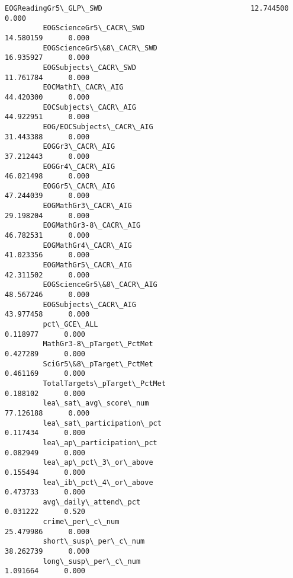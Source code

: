 \documentclass[11pt]{article}
\begin{document}
\begin{Verbatim}[commandchars=\\\{\}]
         EOGReadingGr5\_GLP\_SWD                                   12.744500      0.000   
         EOGScienceGr5\_CACR\_SWD                                  14.580159      0.000   
         EOGScienceGr5\&8\_CACR\_SWD                                16.935927      0.000   
         EOGSubjects\_CACR\_SWD                                    11.761784      0.000   
         EOCMathI\_CACR\_AIG                                       44.420300      0.000   
         EOCSubjects\_CACR\_AIG                                    44.922951      0.000   
         EOG/EOCSubjects\_CACR\_AIG                                31.443388      0.000   
         EOGGr3\_CACR\_AIG                                         37.212443      0.000   
         EOGGr4\_CACR\_AIG                                         46.021498      0.000   
         EOGGr5\_CACR\_AIG                                         47.244039      0.000   
         EOGMathGr3\_CACR\_AIG                                     29.198204      0.000   
         EOGMathGr3-8\_CACR\_AIG                                   46.782531      0.000   
         EOGMathGr4\_CACR\_AIG                                     41.023356      0.000   
         EOGMathGr5\_CACR\_AIG                                     42.311502      0.000   
         EOGScienceGr5\&8\_CACR\_AIG                                48.567246      0.000   
         EOGSubjects\_CACR\_AIG                                    43.977458      0.000   
         pct\_GCE\_ALL                                              0.118977      0.000   
         MathGr3-8\_pTarget\_PctMet                                 0.427289      0.000   
         SciGr5\&8\_pTarget\_PctMet                                  0.461169      0.000   
         TotalTargets\_pTarget\_PctMet                              0.188102      0.000   
         lea\_sat\_avg\_score\_num                                   77.126188      0.000   
         lea\_sat\_participation\_pct                                0.117434      0.000   
         lea\_ap\_participation\_pct                                 0.082949      0.000   
         lea\_ap\_pct\_3\_or\_above                                    0.155494      0.000   
         lea\_ib\_pct\_4\_or\_above                                    0.473733      0.000   
         avg\_daily\_attend\_pct                                     0.031222      0.520   
         crime\_per\_c\_num                                         25.479986      0.000   
         short\_susp\_per\_c\_num                                    38.262739      0.000   
         long\_susp\_per\_c\_num                                      1.091664      0.000   

\end{Verbatim}
\end{document}
